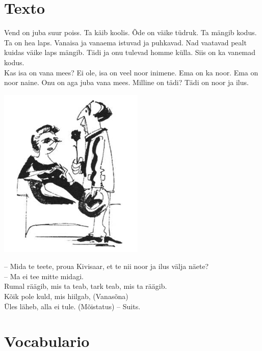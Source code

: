 \Large{\section*{Texto}}

Vend on juba suur poiss. Ta käib koolis. Õde on väike tüdruk. Ta mängib kodus. Ta on hea laps. Vanaisa ja vanaema istuvad ja puhkavad. Nad vaatavad pealt kuidas väike laps mängib. Tädi ja onu tulevad homme külla. Siis on ka vanemad kodus.\\
Kas isa on vana mees? Ei ole, isa on veel noor inimene. Ema on ka noor. Ema on noor naine. Onu on aga juba vana mees. Milline on tädi? Tädi on noor ja ilus. \\

\begin{center}
\includegraphics{img/L04.png}
\end{center}
\bigskip

\noindent
-- Mida te teete, proua Kivisaar, et te nii noor ja ilus välja näete? \\
-- Ma ei tee mitte midagi. \\

\noindent
Rumal räägib, mis ta teab, tark teab, mis ta räägib. \\
Kõik pole kuld, mis hiilgab, (Vanasõna) \\
Üles läheb, alla ei tule. (Mõistatus) -- Suits. \\

\Large{\section*{Vocabulario}}

